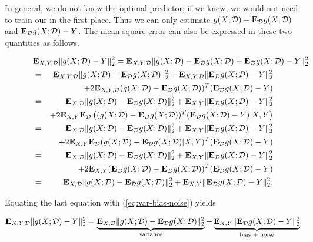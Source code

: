 In general, we do not know the optimal predictor; if we knew, we would not need to train our in the first place.
Thus we can only estimate $g(X;{\mathcal{D}}) - {\bf E{}}_{{\mathcal{D}}} g(X;{\mathcal{D}})$ and
${\bf E{}}_{{\mathcal{D}}} g(X;{\mathcal{D}})-Y$.
The mean square error can also be expressed in these two quantities as follows.

\begin{eqnarray*}
\lefteqn{
\Expect_{X,Y,\dataset} \|g(X;\dataset) - Y\|_2^2
=
\Expect_{X,Y,\dataset} \|g(X;\dataset) - \Expect_\dataset g(X;\dataset) + \Expect_\dataset g(X;\dataset) -Y\|_2^2
}
\\
&=&
	\Expect_{X,Y,\dataset} \|g(X;\dataset) - \Expect_\dataset g(X;\dataset)\|_2^2
	+ \Expect_{X,Y,\dataset} \|\Expect_\dataset g(X;\dataset) -Y\|_2^2
\\
&&
	+ 2\Expect_{X,Y,\dataset} (g(X;\dataset) - \Expect_\dataset g(X;\dataset))^T(\Expect_\dataset g(X;\dataset) -Y)
\\
&=&
	\Expect_{X,\dataset} \|g(X;\dataset) - \Expect_\dataset g(X;\dataset)\|_2^2
	+ \Expect_{X,Y} \|\Expect_\dataset g(X;\dataset) -Y\|_2^2
\\
&&
	+ 2\Expect_{X,Y} \Expect_\dataset \left( (g(X;\dataset) - \Expect_\dataset g(X;\dataset))^T(\Expect_\dataset g(X;\dataset) -Y) |X,Y\right)
\\
&=&
	\Expect_{X,\dataset} \|g(X;\dataset) - \Expect_\dataset g(X;\dataset)\|_2^2
	+ \Expect_{X,Y} \|\Expect_\dataset g(X;\dataset) -Y\|_2^2
\\
&&
	+ 2\Expect_{X,Y} \Expect_\dataset (g(X;\dataset) - \Expect_\dataset g(X;\dataset)|X,Y)^T(\Expect_\dataset g(X;\dataset) -Y)
\\
&=&
	\Expect_{X,\dataset} \|g(X;\dataset) - \Expect_\dataset g(X;\dataset)\|_2^2
	+ \Expect_{X,Y} \|\Expect_\dataset g(X;\dataset) -Y\|_2^2
\\
&&
	+ 2\Expect_{X,Y} (\Expect_\dataset g(X;\dataset) - \Expect_\dataset g(X;\dataset))^T(\Expect_\dataset g(X;\dataset) -Y)
\\
&=&
{\Expect_{X,\dataset} \|g(X;\dataset) - \Expect_\dataset g(X;\dataset)\|_2^2}
+ {\Expect_{X,Y} \|\Expect_\dataset g(X;\dataset) -Y\|_2^2}.
\end{eqnarray*}

Equating the last equation with (\ref{eq:var-bias-noise}) yields

\begin{equation}
{\bf E{}}_{X,Y,{\mathcal{D}}} \|g(X;{\mathcal{D}}) - Y\|_2^2
= \underbrace{{\bf E{}}_{X,{\mathcal{D}}} \|g(X;{\mathcal{D}}) - {\bf E{}}_{{\mathcal{D}}} g(X;{\mathcal{D}})\|_2^2}_\text{variance}
+ \underbrace{{\bf E{}}_{X,Y} \|{\bf E{}}_{{\mathcal{D}}} g(X;{\mathcal{D}}) -Y\|_2^2}_\text{bias + noise}
\end{equation}

